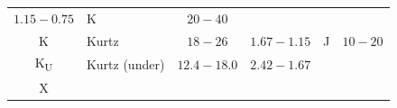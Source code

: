 \documentclass[
]{book}
\begin{document}
\begin{longtable}[]{@{}clcccc@{}}
\begin{minipage}[t]{0.09\columnwidth}
\(1.15 - 0.75\)\strut
\end{minipage} & \begin{minipage}[t]{0.14\columnwidth}\centering
K\strut
\end{minipage} & \begin{minipage}[t]{0.06\columnwidth}\centering
\(20-40\)\strut
\end{minipage}\tabularnewline
\begin{minipage}[t]{0.14\columnwidth}\centering
K\strut
\end{minipage} & \begin{minipage}[t]{0.25\columnwidth}\raggedright
Kurtz\strut
\end{minipage} & \begin{minipage}[t]{0.15\columnwidth}\centering
\(18-26\)\strut
\end{minipage} & \begin{minipage}[t]{0.09\columnwidth}\centering
\(1.67 - 1.15\)\strut
\end{minipage} & \begin{minipage}[t]{0.14\columnwidth}\centering
J\strut
\end{minipage} & \begin{minipage}[t]{0.06\columnwidth}\centering
\(10-20\)\strut
\end{minipage}\tabularnewline
\begin{minipage}[t]{0.14\columnwidth}\centering
K\textsubscript{U}\strut
\end{minipage} & \begin{minipage}[t]{0.25\columnwidth}\raggedright
Kurtz (under)\strut
\end{minipage} & \begin{minipage}[t]{0.15\columnwidth}\centering
\(12.4-18.0\)\strut
\end{minipage} & \begin{minipage}[t]{0.09\columnwidth}\centering
\(2.42 - 1.67\)\strut
\end{minipage} & \begin{minipage}[t]{0.14\columnwidth}\centering
\strut
\end{minipage} & \begin{minipage}[t]{0.06\columnwidth}\centering
\strut
\end{minipage}\tabularnewline
\begin{minipage}[t]{0.14\columnwidth}\centering
X\strut
\end{minipage} & \begin{minipage}[t]{0.25\columnwidth}\raggedright

\end{minipage}
\end{longtable}
\end{document}

